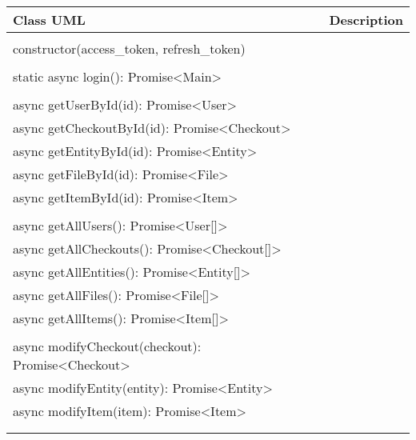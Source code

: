 \documentclass[../../main.tex]{subfiles}
\begin{document}
\noindent \begin{longtable}{ | >{\raggedright}p{} | >{\raggedright\arraybackslash}p{} | }
    \hline
    \textbf{Class UML} & \textbf{Description}                                            \\
    \hline
    \begin{center}
        \begin{tikzpicture}
            \umlclass{Main}
            {
                \underline{Public} \\

                constructor(access\_token, refresh\_token) \\\\

                static async login(): Promise<Main> \\\\

                async getUserById(id): Promise<User> \\
                async getCheckoutById(id): Promise<Checkout> \\
                async getEntityById(id): Promise<Entity> \\
                async getFileById(id): Promise<File> \\
                async getItemById(id): Promise<Item> \\\\

                async getAllUsers(): Promise<User[]> \\
                async getAllCheckouts(): Promise<Checkout[]> \\
                async getAllEntities(): Promise<Entity[]> \\
                async getAllFiles(): Promise<File[]> \\
                async getAllItems(): Promise<Item[]> \\\\

                async modifyCheckout(checkout): Promise<Checkout> \\
                async modifyEntity(entity): Promise<Entity> \\
                async modifyItem(item): Promise<Item> \\\\

}
\end{tikzpicture}
\end{center}
\end{longtable}
\end{document}
